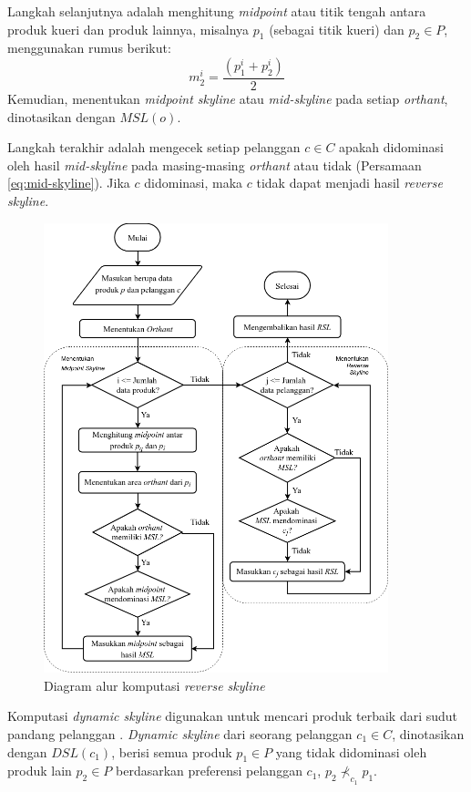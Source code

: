 Langkah selanjutnya adalah menghitung \textit{midpoint} atau titik tengah antara produk kueri dan produk lainnya, misalnya $p_1$ (sebagai titik kueri) dan $p_2 \in P$, menggunakan rumus berikut: 
\begin{equation} \label{eq:midpoint2}
m_2^i = \frac{(p_1^i + p_2^i)}{2}
\end{equation}
Kemudian, menentukan \textit{midpoint skyline} atau \textit{mid-skyline} \cite{mid-skyline} pada setiap \textit{orthant}, dinotasikan dengan $MSL(o)$.

Langkah terakhir adalah mengecek setiap pelanggan $c \in C$ apakah didominasi oleh hasil \textit{mid-skyline} pada masing-masing \textit{orthant} atau tidak (Persamaan \ref{eq:mid-skyline}). Jika $c$ didominasi, maka $c$ tidak dapat menjadi hasil \textit{reverse skyline}.

\begin{figure}[H]
	\centering
	\includegraphics[width=10cm]{assets/img/bab3/flowchart-rsl.png}
	\caption{Diagram alur komputasi \textit{reverse skyline}}
	\label{fig:flowchart-rsl}
\end{figure}

\pagebreak
{}

Komputasi \textit{dynamic skyline} digunakan untuk mencari produk terbaik dari sudut pandang pelanggan \cite{kmpp}. \textit{Dynamic skyline} \cite{dynamic-skyline} dari seorang pelanggan $c_1 \in C$, dinotasikan dengan $DSL(c_1)$, berisi semua produk $p_1 \in P$ yang tidak didominasi oleh produk lain $p_2 \in P$ berdasarkan preferensi pelanggan $c_1$, $p_2 \nprec_{c_1} p_1$. 

